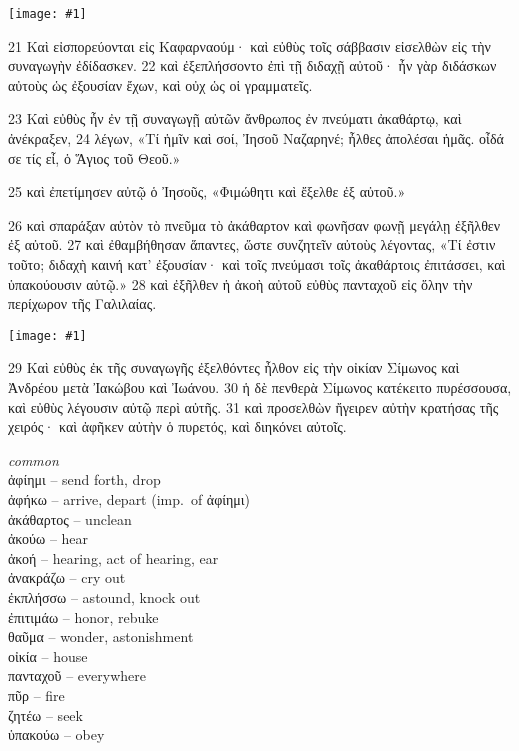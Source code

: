 \documentclass[10pt,a5paper,twoside,twocolumn]{book}
\newcommand{\fig}[1]{\texttt{[image: \#1]}\label{fig:#1}}
\newcommand*\cleartoleftpage{%
  \ifodd\value{page}\hbox{}\clearpage\fi
}
\newenvironment{facing}{\cleartoleftpage}{\clearpage\pagebreak}
\newenvironment{help}{\pagebreak}{}
\newenvironment{helpsec}{\begin{minipage}[t]{\textwidth}\begin{multicols}{2}}{\end{multicols}\end{minipage}}
\newenvironment{vocab}{\begin{helpsec}}{\end{helpsec}}
\begin{document}
\begin{facing}

\fig{01-21} %

21 Καὶ εἰσπορεύονται εἰς Καφαρναούμ· καὶ εὐθὺς τοῖς σάββασιν εἰσελθὼν εἰς τὴν συναγωγὴν ἐδίδασκεν. 22 καὶ ἐξεπλήσσοντο ἐπὶ τῇ διδαχῇ αὐτοῦ· ἦν γὰρ διδάσκων αὐτοὺς ὡς ἐξουσίαν ἔχων, καὶ οὐχ ὡς οἱ γραμματεῖς.

23 Καὶ εὐθὺς ἦν ἐν τῇ συναγωγῇ αὐτῶν ἄνθρωπος ἐν πνεύματι ἀκαθάρτῳ, καὶ ἀνέκραξεν, 
24 λέγων, «Τί ἡμῖν καὶ σοί, Ἰησοῦ Ναζαρηνέ; ἦλθες ἀπολέσαι ἡμᾶς. οἶδά σε τίς εἶ, ὁ Ἅγιος τοῦ Θεοῦ.»

25 καὶ ἐπετίμησεν αὐτῷ ὁ Ἰησοῦς, «Φιμώθητι καὶ ἔξελθε ἐξ αὐτοῦ.»

26 καὶ σπαράξαν αὐτὸν τὸ πνεῦμα τὸ ἀκάθαρτον καὶ φωνῆσαν φωνῇ μεγάλῃ ἐξῆλθεν ἐξ αὐτοῦ.
27 καὶ ἐθαμβήθησαν ἅπαντες, ὥστε συνζητεῖν αὐτοὺς λέγοντας, «Τί ἐστιν τοῦτο; διδαχὴ καινή κατ’ ἐξουσίαν· καὶ τοῖς πνεύμασι τοῖς ἀκαθάρτοις ἐπιτάσσει, 
καὶ ὑπακούουσιν αὐτῷ.»
28 καὶ ἐξῆλθεν ἡ ἀκοὴ αὐτοῦ εὐθὺς πανταχοῦ εἰς ὅλην τὴν περίχωρον τῆς Γαλιλαίας.

\fig{01-29} %

29 Καὶ εὐθὺς ἐκ τῆς συναγωγῆς ἐξελθόντες ἦλθον εἰς τὴν οἰκίαν Σίμωνος καὶ Ἀνδρέου μετὰ Ἰακώβου καὶ Ἰωάνου. 30 ἡ δὲ πενθερὰ Σίμωνος κατέκειτο πυρέσσουσα, καὶ εὐθὺς λέγουσιν αὐτῷ περὶ αὐτῆς. 31 καὶ προσελθὼν ἤγειρεν αὐτὴν κρατήσας τῆς χειρός· καὶ ἀφῆκεν αὐτὴν ὁ πυρετός, καὶ διηκόνει αὐτοῖς. 

\begin{help}
\begin{vocab}
\emph{common}\\
ἀφίημι -- send forth, drop\\
ἀφήκω -- arrive, depart (imp.~of ἀφίημι)\\
ἀκάθαρτος -- unclean\\
ἀκούω -- hear\\
ἀκοή -- hearing, act of hearing, ear\\
ἀνακράζω -- cry out \\
ἐκπλήσσω -- astound, knock out\\
ἐπιτιμάω -- honor, rebuke\\
θαῦμα -- wonder, astonishment\\
οἰκία -- house\\
πανταχοῦ -- everywhere\\
πῦρ -- fire\\
ζητέω -- seek \\
ὑπακούω -- obey\\


\end{vocab}
\end{help}
\end{facing}
\end{document}
